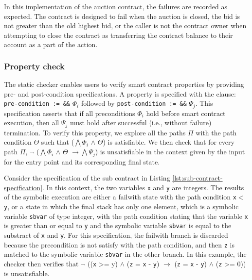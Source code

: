 \documentclass[a4paper,USenglish,cleveref, autoref,anonymous]{lipics-v2021}
\begin{document}
In this implementation of the auction contract, the failures are
recorded as expected. The contract is designed to fail when the
auction is closed, the bid is not greater than the old highest bid, or
the caller is not the contract owner when attempting to close the
contract as transferring the contract balance to their account as a
part of the action. 

\subsubsection{Property check}
\label{sec:property-check}

The static checker enables users to verify smart contract properties
by providing pre- and post-condition specifications. A property is
specified with the clause:  \lstinline/pre-condition := &&/
$\Phi_{i}$ followed by \lstinline/post-condition := &&/ $\Psi_{j}$. This
specification asserts that if all preconditions $\Phi_{i}$ hold before
smart contract execution, then all $\Psi_{j}$ must hold after
successful (i.e., without failure) termination. To verify this
property, we explore all the paths $\Pi$ 
with the path condition $\Theta$ such that ($\bigwedge \Phi_{i}$
$\land$ $\Theta$) is satisfiable. We then check that for every path
$\Pi$, $\neg$ ($\bigwedge \Phi_{i}$ $\land$ $\Theta$ $\rightarrow \bigwedge \Psi_{j}$) is unsatisfiable in the context given by the input for the entry point
and its corresponding final state.

Consider the specification of the sub contract in Listing
\ref{lst:sub-contract-specification}. In this context, the two
variables \lstinline/x/ and \lstinline/y/ are integers. The results of
the symbolic execution are either a failwith state with the path
condition \lstinline/x/$<$\lstinline/y/,  or a state in which the
final stack has only one element, which is a symbolic variable
\lstinline/sbvar/ of type integer, with the path condition stating
that the variable \lstinline/x/ is greater than or equal to
\lstinline/y/ and the symbolic variable \lstinline/sbvar/ is equal to
the substract of \lstinline/x/ and \lstinline/y/.  For this specification,
the failwith branch is discarded because the precondition is not
satisfy with the	 path condition, and then \lstinline/z/ is matched to
the symbolic variable \lstinline/sbvar/ in the other branch. In this
example, the checker then verifies that $\neg$ ((\lstinline/x/ >= y) $\land$ (\lstinline/z/
= \lstinline/x/ - \lstinline/y/) $\rightarrow$ (\lstinline/z/ = \lstinline/x/ - \lstinline/y/) $\land$ (\lstinline/z/ >= 0)) is unsatisfiable.
\end{document}
